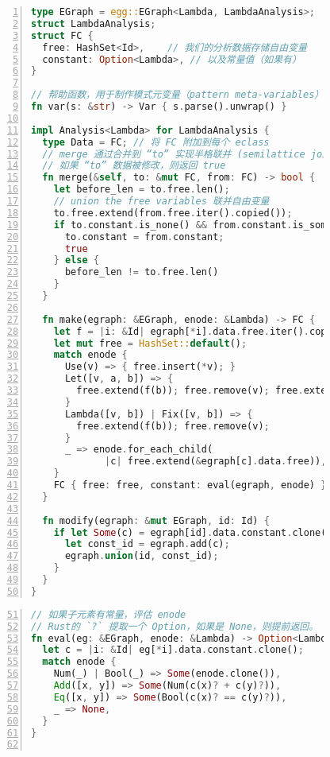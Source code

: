 \begin{figure}
\begin{minipage}[t]{0.49\linewidth}
  \begin{lstlisting}[language=Rust, basicstyle=\tiny\ttfamily, numbers=left]
type EGraph = egg::EGraph<Lambda, LambdaAnalysis>;
struct LambdaAnalysis;
struct FC {
  free: HashSet<Id>,    // 我们的分析数据存储自由变量
  constant: Option<Lambda>, // 以及常量值（如果有）
}

// 帮助函数，用于制作模式元变量（pattern meta-variables）
fn var(s: &str) -> Var { s.parse().unwrap() }

impl Analysis<Lambda> for LambdaAnalysis {
  type Data = FC; // 将 FC 附加到每个 eclass
  // merge 通过合并到 “to” 实现半格联并 (semilattice join)
  // 如果 “to” 数据被修改，则返回 true
  fn merge(&self, to: &mut FC, from: FC) -> bool {
    let before_len = to.free.len();
    // union the free variables 联并自由变量
    to.free.extend(from.free.iter().copied());
    if to.constant.is_none() && from.constant.is_some() {
      to.constant = from.constant;
      true
    } else {
      before_len != to.free.len()
    }
  }

  fn make(egraph: &EGraph, enode: &Lambda) -> FC {
    let f = |i: &Id| egraph[*i].data.free.iter().copied();
    let mut free = HashSet::default();
    match enode {
      Use(v) => { free.insert(*v); }
      Let([v, a, b]) => {
        free.extend(f(b)); free.remove(v); free.extend(f(a));
      }
      Lambda([v, b]) | Fix([v, b]) => {
        free.extend(f(b)); free.remove(v);
      }
      _ => enode.for_each_child(
             |c| free.extend(&egraph[c].data.free)),
    }
    FC { free: free, constant: eval(egraph, enode) }
  }

  fn modify(egraph: &mut EGraph, id: Id) {
    if let Some(c) = egraph[id].data.constant.clone() {
      let const_id = egraph.add(c);
      egraph.union(id, const_id);
    }
  }
}\end{lstlisting}
\end{minipage}
\hfill
\begin{minipage}[t]{0.46\linewidth}
  \begin{lstlisting}[language=Rust, basicstyle=\tiny\ttfamily, escapechar=@, numbers=left, firstnumber=51]
// 如果子元素有常量，评估 enode
// Rust的 `?` 提取一个 Option，如果是 None，则提前返回。
fn eval(eg: &EGraph, enode: &Lambda) -> Option<Lambda> {
  let c = |i: &Id| eg[*i].data.constant.clone();
  match enode {
    Num(_) | Bool(_) => Some(enode.clone()),
    Add([x, y]) => Some(Num(c(x)? + c(y)?)),
    Eq([x, y]) => Some(Bool(c(x)? == c(y)?)),
    _ => None,
  }
}


\end{lstlisting}
\end{minipage}
\end{figure}
